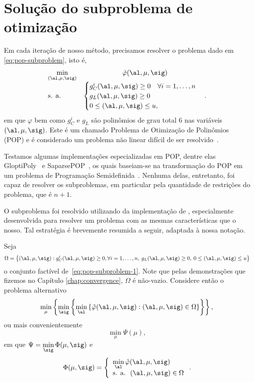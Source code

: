 \section{Solução do subproblema de otimização}

Em cada iteração de nosso método, precisamos resolver o problema dado em \eqref{eq:pop-subproblem}, isto é, 
\begin{equation}
	\label{eq:pop-subproblem-1}
	\begin{array}{lc}
\displaystyle \min_{(\al,\mu,\sig)} & \hat\varphi(\al,\mu,\sig) \\
\text{s. a.} &\begin{cases} g_C^i(\al,\mu,\sig) \geq 0 \quad \forall i = 1,\ldots,n \\
				g_L(\al,\mu,\sig)   \geq 0 	\\
				 0\leq (\al,\mu,\sig) \leq u,
				 	
				 \end{cases}.
\end{array}
\end{equation}
em que $\varphi$ bem como $g_{C}^{i}$ e $g_{L}$ são polinômios de grau total 6 nas variáveis $(\al,\mu,\sig)$. Este é um chamado Problema de Otimização de Polinômios (POP) e é considerado um problema não linear  difícil de ser resolvido~\cite{Laurent:2010kp}.

Testamos algumas  implementações especializadas em POP, dentre elas GloptiPoly~\cite{Henrion:2009eb} e SaparsePOP~\cite{Waki:2008ie}, os quais baseiam-se na transformação do POP em um problema de Programação Semidefinida~\cite{Lasserre:2001fw}. Nenhuma delas, entretanto, foi capaz de resolver os subproblemas, em particular pela quantidade de restrições do problema, que é  $n+1$.  


O subproblema foi resolvido utilizando da implementação de \textcite{VillasBoas:2012ur,VillasBoas2013:wn}, especialmente desenvolvida para resolver um problema com as mesmas características que o nosso.  Tal estratégia é brevemente resumida a seguir, adaptada à nossa notação.

Seja
\[\Omega = \left\{(\al,\mu,\sig): g_C^i(\al,\mu,\sig) \geq0, \forall i = 1,\ldots,n,\: g_L(\al,\mu,\sig)   \geq 0,\:		 0\leq (\al,\mu,\sig) \leq u\right\}\]
o conjunto factível de~\eqref{eq:pop-subproblem-1}. Note que pelas demonstrações que fizemos no Capítulo \ref{chap:convergence}, $\Omega$ é não-vazio. Considere então o problema alternativo
\begin{equation}
		\label{eq:pop-subproblem-2}
\displaystyle  \min_{\mu}\left\{  \min_{\sig} \left\{ \min_{\al} \left\{ \nextphi(\al,\mu,\sig):    (\al,\mu,\sig) \in \Omega  \right\} \right\}\right\}, \\
\end{equation}
ou mais convenientemente 
\[
\displaystyle \min_{\mu}\Psi(\mu),
\]
em que  $\displaystyle \Psi = \min_{\sig}\Phi(\mu,\sig)$ e 
\[
\Phi(\mu,\sig) = \left\{
	\begin{array}{l}
\displaystyle \min_{\al}  \nextphi(\al,\mu,\sig) \\
\text{s. a. }\:  (\al,\mu,\sig) \in\Omega
\end{array}\right..
\]
  
